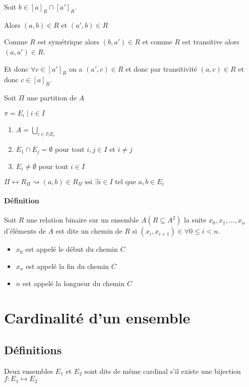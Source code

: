 \documentclass[12pt, a4paper]{report}
\begin{document}
Soit $b \in [a]_{R} \cap [a']_{R}$.


Alors $(a, b) \in R$ et $(a', b) \in R$


Comme $R$ est symétrique alors $(b, a') \in R$ et comme $R$ est
transitive alors $(a, a') \in R$.

Et donc $\forall c \in [a']_{R}$ on a $(a', c) \in R$ et donc par
transitivité $(a,c) \in R$ et donc $c \in [a]_{R}$.


Soit $\Pi$ une partition de $A$

$\pi = { E_i \mid i \in I }$

\begin{enumerate}
\item $A = \bigcup_{i \in I) E_i}$
\item $E_1 \cap E_j = \emptyset$ pour tout $i, j \in I$ et $i\neq j$
\item $E_i \neq \emptyset$ pour tout $i \in I$
\end{enumerate}

$\Pi \leftrightarrow R_{\Pi} \rightsquigarrow (a,b)\in R_{\Pi} \text{ ssi } \exists i \in I \text{ tel que } a, b \in E_i$


\paragraph{Définition}

Soit $R$ une relation binaire sur un ensemble $A (R \subseteq A^2)$ la suite $x_0, x_1, ..., x_n$ d'éléments de $A$ est dite un chemin de $R$ si $(x_i, x_{i+1}) \in \forall 0 \leq i < n$.

\begin{itemize}
\item $x_0$ est appelé le début du chemin $C$
\item $x_n$ est appelé la fin du chemin $C$
\item $n$ est appelé la longueur du chemin $C$
\end{itemize}

\section{Cardinalité d'un ensemble}

\subsection{Définitions}

Deux ensembles $E_1$ et $E_2$ sont dits de même cardinal s'il existe une bijection
$f : E_1 \mapsto E_2$
\end{document}
